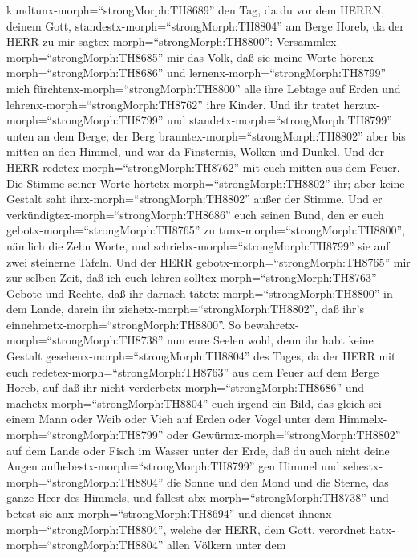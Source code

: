 kundtunx-morph=``strongMorph:TH8689''  den Tag, da du vor
dem HERRN, deinem Gott, standestx-morph=``strongMorph:TH8804'' am Berge
Horeb, da der HERR zu mir sagtex-morph=``strongMorph:TH8800'':
Versammlex-morph=``strongMorph:TH8685'' mir das Volk, daß sie meine
Worte hörenx-morph=``strongMorph:TH8686'' und
lernenx-morph=``strongMorph:TH8799'' mich
fürchtenx-morph=``strongMorph:TH8800'' alle ihre Lebtage auf Erden und
lehrenx-morph=``strongMorph:TH8762'' ihre Kinder.  Und ihr
tratet herzux-morph=``strongMorph:TH8799'' und
standetx-morph=``strongMorph:TH8799'' unten an dem Berge; der Berg
branntex-morph=``strongMorph:TH8802'' aber bis mitten an den Himmel, und
war da Finsternis, Wolken und Dunkel.  Und der HERR
redetex-morph=``strongMorph:TH8762'' mit euch mitten aus dem Feuer. Die
Stimme seiner Worte hörtetx-morph=``strongMorph:TH8802'' ihr; aber keine
Gestalt saht ihrx-morph=``strongMorph:TH8802'' außer der Stimme.
 Und er verkündigtex-morph=``strongMorph:TH8686'' euch
seinen Bund, den er euch gebotx-morph=``strongMorph:TH8765'' zu
tunx-morph=``strongMorph:TH8800'', nämlich die Zehn Worte, und
schriebx-morph=``strongMorph:TH8799'' sie auf zwei steinerne Tafeln.
 Und der HERR gebotx-morph=``strongMorph:TH8765'' mir zur
selben Zeit, daß ich euch lehren solltex-morph=``strongMorph:TH8763''
Gebote und Rechte, daß ihr darnach tätetx-morph=``strongMorph:TH8800''
in dem Lande, darein ihr ziehetx-morph=``strongMorph:TH8802'', daß ihr's
einnehmetx-morph=``strongMorph:TH8800''.  So
bewahretx-morph=``strongMorph:TH8738'' nun eure Seelen wohl, denn ihr
habt keine Gestalt gesehenx-morph=``strongMorph:TH8804'' des Tages, da
der HERR mit euch redetex-morph=``strongMorph:TH8763'' aus dem Feuer auf
dem Berge Horeb,  auf daß ihr nicht
verderbetx-morph=``strongMorph:TH8686'' und
machetx-morph=``strongMorph:TH8804'' euch irgend ein Bild, das gleich
sei einem Mann oder Weib  oder Vieh auf Erden oder Vogel
unter dem Himmelx-morph=``strongMorph:TH8799''  oder
Gewürmx-morph=``strongMorph:TH8802'' auf dem Lande oder Fisch im Wasser
unter der Erde,  daß du auch nicht deine Augen
aufhebestx-morph=``strongMorph:TH8799'' gen Himmel und
sehestx-morph=``strongMorph:TH8804'' die Sonne und den Mond und die
Sterne, das ganze Heer des Himmels, und fallest
abx-morph=``strongMorph:TH8738'' und betest sie
anx-morph=``strongMorph:TH8694'' und dienest
ihnenx-morph=``strongMorph:TH8804'', welche der HERR, dein Gott,
verordnet hatx-morph=``strongMorph:TH8804'' allen Völkern unter dem
